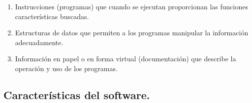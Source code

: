 \documentclass{article}
\begin{document}
\begin{enumerate}
\item Instrucciones (programas) que cuando se ejecutan proporcionan las funciones características buscadas.

\item Estructuras de datos que permiten a los programas manipular la información adecuadamente.

\item Información en papel o en forma virtual (documentación) que describe la operación y uso de los programas.
\end{enumerate}

\subsection{Características del software.}
\end{document}
